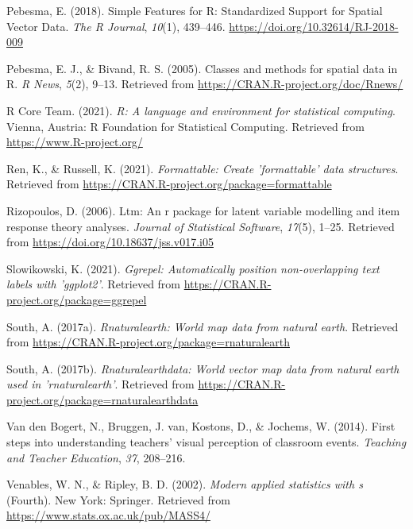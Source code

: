 \documentclass[
  man]{apa6}
\newlength{\cslhangindent}
\newlength{\cslentryspacingunit} %
\newenvironment{CSLReferences}[2] %
 {%
  \setlength{\parindent}{0pt}
  \ifodd #1
  \let\oldpar\par
  \def\par{\hangindent=\cslhangindent\oldpar}
  \fi
  \setlength{\parskip}{#2\cslentryspacingunit}
 }%
 {}
\begin{document}
\begin{CSLReferences}{1}{0}
\leavevmode{}%
Pebesma, E. (2018). {Simple Features for R: Standardized Support for Spatial Vector Data}. \emph{{The R Journal}}, \emph{10}(1), 439--446. \url{https://doi.org/10.32614/RJ-2018-009}

\leavevmode{}%
Pebesma, E. J., \& Bivand, R. S. (2005). Classes and methods for spatial data in {R}. \emph{R News}, \emph{5}(2), 9--13. Retrieved from \url{https://CRAN.R-project.org/doc/Rnews/}

\leavevmode{}%
R Core Team. (2021). \emph{R: A language and environment for statistical computing}. Vienna, Austria: R Foundation for Statistical Computing. Retrieved from \url{https://www.R-project.org/}

\leavevmode{}%
Ren, K., \& Russell, K. (2021). \emph{Formattable: Create 'formattable' data structures}. Retrieved from \url{https://CRAN.R-project.org/package=formattable}

\leavevmode{}%
Rizopoulos, D. (2006). Ltm: An r package for latent variable modelling and item response theory analyses. \emph{Journal of Statistical Software}, \emph{17}(5), 1--25. Retrieved from \url{https://doi.org/10.18637/jss.v017.i05}

\leavevmode{}%
Slowikowski, K. (2021). \emph{Ggrepel: Automatically position non-overlapping text labels with 'ggplot2'}. Retrieved from \url{https://CRAN.R-project.org/package=ggrepel}

\leavevmode{}%
South, A. (2017a). \emph{Rnaturalearth: World map data from natural earth}. Retrieved from \url{https://CRAN.R-project.org/package=rnaturalearth}

\leavevmode{}%
South, A. (2017b). \emph{Rnaturalearthdata: World vector map data from natural earth used in 'rnaturalearth'}. Retrieved from \url{https://CRAN.R-project.org/package=rnaturalearthdata}

\leavevmode{}%
Van den Bogert, N., Bruggen, J. van, Kostons, D., \& Jochems, W. (2014). First steps into understanding teachers' visual perception of classroom events. \emph{Teaching and Teacher Education}, \emph{37}, 208--216.

\leavevmode{}%
Venables, W. N., \& Ripley, B. D. (2002). \emph{Modern applied statistics with s} (Fourth). New York: Springer. Retrieved from \url{https://www.stats.ox.ac.uk/pub/MASS4/}


\end{CSLReferences}
\end{document}
